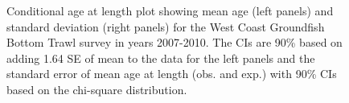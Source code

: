 \documentclass[
]{scrartcl}
\begin{document}
\begin{figure}[H]


\caption{\label{fig-call-plot-wcgbts2}Conditional age at length plot
showing mean age (left panels) and standard deviation (right panels) for
the West Coast Groundfish Bottom Trawl survey in years 2007-2010. The
CIs are 90\% based on adding 1.64 SE of mean to the data for the left
panels and the standard error of mean age at length (obs. and exp.) with
90\% CIs based on the chi-square distribution.}

\end{figure}%
\end{document}
